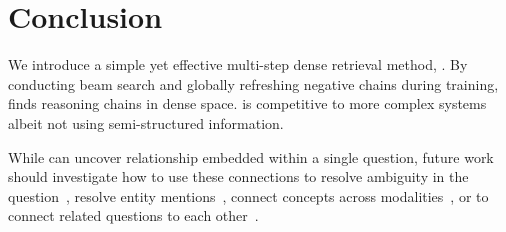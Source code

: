 \section{Conclusion}
\label{sec:conclu}

We introduce a simple yet effective multi-step dense retrieval method,
\name{}.
%
By conducting
beam search and globally refreshing negative chains during
training,  \name{} finds reasoning chains in dense
space.
%
\name{} is competitive to more complex   
systems albeit not using semi-structured information.
%


While \name{} can uncover relationship embedded within a single
question, future work should investigate how to use these connections
to resolve ambiguity in the question~\cite{elgohary-19,min-20},
resolve entity mentions~\cite{guha-etal-2015-removing}, connect concepts across
modalities~\cite{lei-18}, or to connect related questions to each
other~\cite{elgohary-18}.
